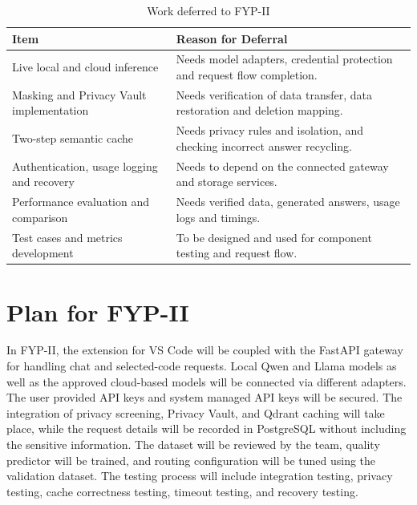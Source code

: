 \begin{table}[!htbp]
\centering\small
{}\small\setlength{\parskip}{0pt}\setlength{\tabcolsep}{5pt}\setlength{\extrarowheight}{1.5pt}\renewcommand{\arraystretch}{1.25}
\caption{Work deferred to FYP-II}
\begin{tabular}{|p{}|p{}|}\hline
\textbf{Item} & \textbf{Reason for Deferral} \\ \hline
Live local and cloud inference & Needs model adapters, credential protection and request flow completion. \\ \hline
Masking and Privacy Vault implementation & Needs verification of data transfer, data restoration and deletion mapping. \\ \hline
Two-step semantic cache & Needs privacy rules and isolation, and checking incorrect answer recycling. \\ \hline
Authentication, usage logging and recovery & Needs to depend on the connected gateway and storage services. \\ \hline
Performance evaluation and comparison & Needs verified data, generated answers, usage logs and timings. \\ \hline
Test cases and metrics development & To be designed and used for component testing and request flow. \\ \hline
\end{tabular}
\label{tab:deferred_work}
\end{table}

\section{Plan for FYP-II}
In FYP-II, the extension for VS Code will be coupled with the FastAPI gateway for handling chat and selected-code requests. Local Qwen and Llama models as well as the approved cloud-based models will be connected via different adapters. The user provided API keys and system managed API keys will be secured. The integration of privacy screening, Privacy Vault, and Qdrant caching will take place, while the request details will be recorded in PostgreSQL without including the sensitive information. The dataset will be reviewed by the team, quality predictor will be trained, and routing configuration will be tuned using the validation dataset. The testing process will include integration testing, privacy testing, cache correctness testing, timeout testing, and recovery testing.

